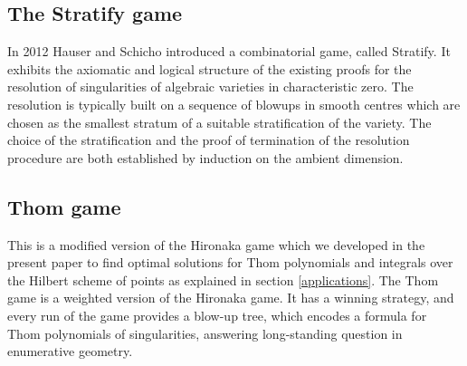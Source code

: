 \documentclass{article}
\theoremstyle{plain}
\theoremstyle{definition}
\theoremstyle{remark}
\begin{document}
\subsection{The Stratify game}

In 2012 Hauser and Schicho \cite{hauser1} introduced a combinatorial game, called Stratify. It exhibits the axiomatic and logical 
structure of the existing proofs for the resolution of singularities of algebraic varieties in characteristic zero. 
The resolution is typically built on a sequence of blowups in smooth centres which are chosen as the smallest stratum 
of a suitable stratification of the variety. The choice of the stratification and the proof of termination of the 
resolution procedure are both established by induction on the ambient dimension. 

\subsection{Thom game}

This is a modified version of the Hironaka game which we developed in the present paper to find optimal solutions for Thom polynomials and integrals over the Hilbert scheme of points as explained in section \ref{applications}.  
The Thom game is a weighted version of the Hironaka game. It has a winning strategy, and
every run of the game provides a blow-up tree, which encodes a formula for Thom polynomials of singularities, answering 
long-standing question in enumerative geometry.
\end{document}
